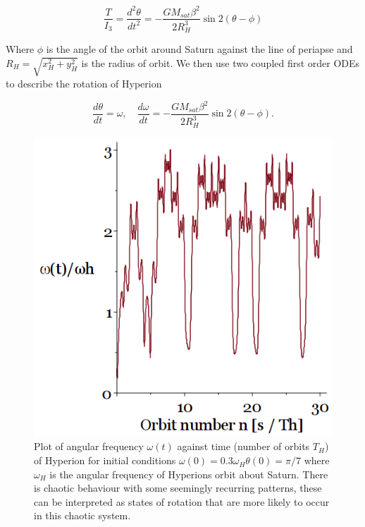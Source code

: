 \documentclass[10pt, twocolumn]{article} %
\begin{document}
\begin{equation}
    \frac{T}{I_3} = \frac{d^2\theta}{dt^2} = - \frac{GM_{sat}\beta^2}{2R_{H}^{3}}\sin 2(\theta - \phi)
\end{equation}

Where $\phi$ is the angle of the orbit around Saturn against the line of periapse and $R_H = \sqrt{x_H^2 + y_H^2}$ is the radius of orbit. We then use two coupled first order ODEs to describe the rotation of Hyperion

\begin{equation}
  \label{angle_ODEs}
  \frac{d\theta}{dt} = \omega, \quad \frac{d\omega}{dt} = - \frac{GM_{sat}\beta^2}{2R_{H}^{3}}\sin 2(\theta - \phi). 
\end{equation}

\begin{figure}[tb!]
\centering
\includegraphics[width=0.95\columnwidth]{angular_freq_chaos.png}
  \caption{Plot of angular frequency $\omega(t)$ against time (number of orbits $T_H$) of Hyperion for initial conditions $\omega(0) = 0.3\omega_H \theta(0) = \pi/7$ where $\omega_H$ is the angular frequency of Hyperions orbit about Saturn. There is chaotic behaviour with some seemingly recurring patterns, these can be interpreted as states of rotation that are more likely to occur in this chaotic system.}
\label{angular_freq_chaos}
\end{figure}
\end{document}
